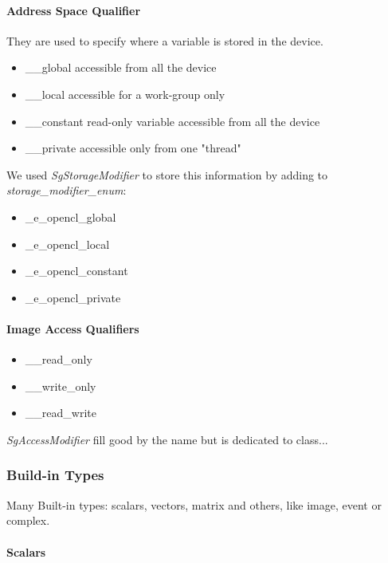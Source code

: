 				\paragraph{Address Space Qualifier}
				
They are used to specify where a variable is stored in the device.
\begin{itemize}
	\item \_\_global accessible from all the device
	\item \_\_local accessible for a work-group only
	\item \_\_constant read-only variable accessible from all the device
	\item \_\_private accessible only from one "thread"
\end{itemize}

We used \emph{SgStorageModifier} to store this information by adding to \emph{storage\_modifier\_enum}:
\begin{itemize}
	\item \_e\_opencl\_global
	\item \_e\_opencl\_local
	\item \_e\_opencl\_constant
	\item \_e\_opencl\_private
\end{itemize}

				\paragraph{Image Access Qualifiers}

\begin{itemize}
	\item \_\_read\_only
	\item \_\_write\_only
	\item \_\_read\_write
\end{itemize}

{\color{red} \emph{SgAccessModifier} fill good by the name but is dedicated to class...}

			\subsubsection{Build-in Types}

Many Built-in types: scalars, vectors, matrix and others, like image, event or complex.

				\paragraph{Scalars}
				
